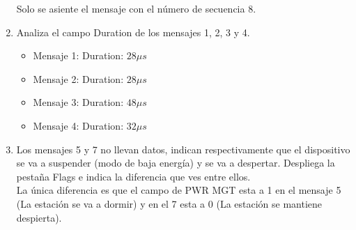 \documentclass[12pt, a4paper]{report}
\begin{document}
\begin{enumerate}
	Solo se asiente el mensaje con el número de secuencia 8.
	\item Analiza el campo Duration de los mensajes 1, 2, 3 y 4.\\
	\begin{itemize}
		\item Mensaje 1: Duration: $28\mu s$\\
		\item Mensaje 2: Duration: $28\mu s$\\
		\item Mensaje 3: Duration: $48\mu s$\\
		\item Mensaje 4: Duration: $32\mu s$\\
	\end{itemize}
	\item Los mensajes 5 y 7 no llevan datos, indican respectivamente que el dispositivo se va a suspender
	(modo de baja energía) y se va a despertar. Despliega la pestaña Flags e indica la diferencia que
	ves entre ellos.\\
	
	La única diferencia es que el campo de PWR MGT esta a 1 en el mensaje 5 (La estación se va a dormir) y en el 7 esta a 0 (La estación se mantiene despierta).
\end{enumerate}
\end{document}
